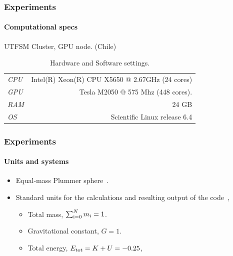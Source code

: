 \begin{frame}
    \frametitle{Experiments}
    \framesubtitle{Computational specs}


    UTFSM Cluster, GPU node. (Chile)
    \begin{table}[H]
        \centering
        \begin{tabular}{lr}
            \hline
            \emph{CPU} & Intel(R) Xeon(R) CPU X5650 @ 2.67GHz (24 cores) \\
            \emph{GPU} & Tesla M2050 @ 575 Mhz (448 cores). \\
            \emph{RAM} & 24 GB \\
            \emph{OS}  & Scientific Linux release 6.4 \\
            \hline
        \end{tabular}
        \caption{Hardware and Software settings.}
        \label{tab:hw}
    \end{table}

\end{frame}

\begin{frame}
    \frametitle{Experiments}
    \framesubtitle{Units and systems}

    \begin{itemize}
        \item Equal-mass Plummer sphere~\cite{plummer1911}.
        \item Standard {\nbody} units for the calculations and resulting output of
        the code~\cite{Henon,Heggie1986},

        \begin{block}{}
            \begin{itemize}
                \item Total mass, $\sum^{N}_{\rm i=0} m_{i} = 1$.
                \item Gravitational constant, $G=1$.
                \item Total energy, $E_{\rm tot} = K + U = -0.25$,
            \end{itemize}
        \end{block}
    \end{itemize}

\end{frame}

%
%
%
%

